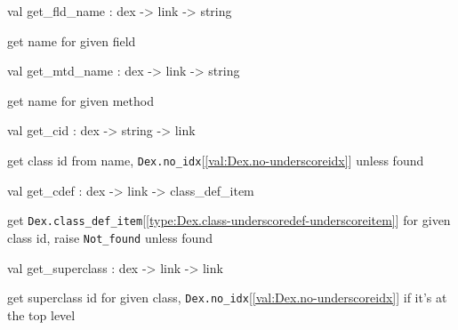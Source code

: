 \documentclass[11pt]{article}
\begin{document}
\label{val:Dex.get-underscorefld-underscorename}\begin{ocamldoccode}
val get_fld_name : dex -> link -> string
\end{ocamldoccode}
\begin{ocamldocdescription}
get name for given field


\end{ocamldocdescription}




\label{val:Dex.get-underscoremtd-underscorename}\begin{ocamldoccode}
val get_mtd_name : dex -> link -> string
\end{ocamldoccode}
\begin{ocamldocdescription}
get name for given method


\end{ocamldocdescription}




\label{val:Dex.get-underscorecid}\begin{ocamldoccode}
val get_cid : dex -> string -> link
\end{ocamldoccode}
\begin{ocamldocdescription}
get class id from name, {\tt{Dex.no\_idx}}[\ref{val:Dex.no-underscoreidx}] unless found


\end{ocamldocdescription}




\label{val:Dex.get-underscorecdef}\begin{ocamldoccode}
val get_cdef : dex -> link -> class_def_item
\end{ocamldoccode}
\begin{ocamldocdescription}
get {\tt{Dex.class\_def\_item}}[\ref{type:Dex.class-underscoredef-underscoreitem}] for given class id,
 raise {\tt{Not\_found}} unless found


\end{ocamldocdescription}




\label{val:Dex.get-underscoresuperclass}\begin{ocamldoccode}
val get_superclass : dex -> link -> link
\end{ocamldoccode}
\begin{ocamldocdescription}
get superclass id for given class,
 {\tt{Dex.no\_idx}}[\ref{val:Dex.no-underscoreidx}] if it's at the top level


\end{ocamldocdescription}
\end{document}
